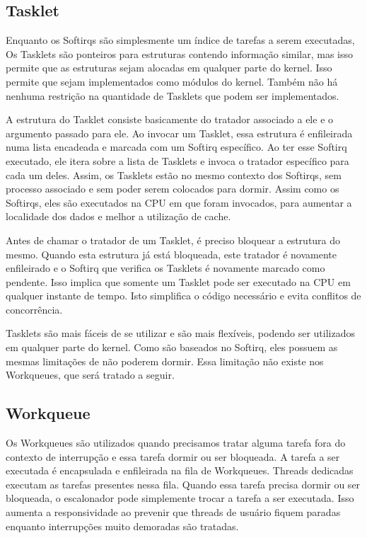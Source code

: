 \subsection{Tasklet}

Enquanto os Softirqs são simplesmente um índice de tarefas a serem executadas, Os Tasklets são ponteiros para estruturas contendo informação similar, mas isso permite que as estruturas sejam alocadas em qualquer parte do kernel. Isso permite que sejam implementados como módulos do kernel. Também não há nenhuma restrição na quantidade de Tasklets que podem ser implementados.

A estrutura do Tasklet consiste basicamente do tratador associado a ele e o argumento passado para ele. Ao invocar um Tasklet, essa estrutura é enfileirada numa lista encadeada e marcada com um Softirq específico. Ao ter esse Softirq executado, ele itera sobre a lista de Tasklets e invoca o tratador específico para cada um deles. Assim, os Tasklets estão no mesmo contexto dos Softirqs, sem processo associado e sem poder serem colocados para dormir. Assim como os Softirqs, eles são executados na CPU em que foram invocados, para aumentar a localidade dos dados e melhor a utilização de cache.

Antes de chamar o tratador de um Tasklet, é preciso bloquear a estrutura do mesmo. Quando esta estrutura já está bloqueada, este tratador é novamente enfileirado e o Softirq que verifica os Tasklets é novamente marcado como pendente. Isso implica que somente um Tasklet pode ser executado na CPU em qualquer instante de tempo. Isto simplifica o código necessário e evita conflitos de concorrência.

Tasklets são mais fáceis de se utilizar e são mais flexíveis, podendo ser utilizados em qualquer parte do kernel. Como são baseados no Softirq, eles possuem as mesmas limitações de não poderem dormir. Essa limitação não existe nos Workqueues, que será tratado a seguir.

\subsection{Workqueue}

Os Workqueues são utilizados quando precisamos tratar alguma tarefa fora do contexto de interrupção e essa tarefa dormir ou ser bloqueada. A tarefa a ser executada é encapsulada e enfileirada na fila de Workqueues. Threads dedicadas executam as tarefas presentes nessa fila. Quando essa tarefa precisa dormir ou ser bloqueada, o escalonador pode simplemente trocar a tarefa a ser executada. Isso aumenta a responsividade ao prevenir que threads de usuário fiquem paradas enquanto interrupções muito demoradas são tratadas.

